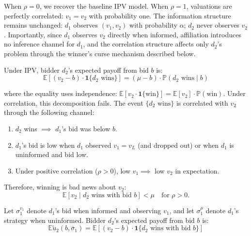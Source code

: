 \documentclass[11pt]{article}
\theoremstyle{plain}
\theoremstyle{definition}
\theoremstyle{plain}
\theoremstyle{plain}
\theoremstyle{plain}
\theoremstyle{plain}
\numberwithin{equation}{section}
\begin{document}
\noindent When $\rho = 0$, we recover the baseline IPV model. When $\rho = 1$, valuations are perfectly correlated: $v_1 = v_2$ with probability one. The information structure remains unchanged: $d_1$ observes $(v_1, v_2)$ with probability $\alpha$; $d_2$ never observes $v_2$. Importantly, since $d_1$ observes $v_2$ directly when informed, affiliation introduces no inference channel for $d_1$, and the correlation structure affects only $d_2$'s problem through the winner's curse mechanism described below.

\vspace{0.3cm}

\noindent Under IPV, bidder $d_2$'s expected payoff from bid $b$ is:
\begin{equation*}
    \mathbb{E}[(v_2 - b) \cdot \mathbf{1}\{d_2 \text{ wins}\}] = (\mu - b) \cdot \mathbb{P}(d_2 \text{ wins} \mid b)
\end{equation*}

\noindent where the equality uses independence: $\mathbb{E}[v_2 \cdot \mathbf{1}\{\text{win}\}] = \mathbb{E}[v_2] \cdot \mathbb{P}(\text{win})$. Under correlation, this decomposition fails. The event $\{d_2 \text{ wins}\}$ is correlated with $v_2$ through the following channel:
\begin{enumerate}
    \item $d_2$ wins $\implies$ $d_1$'s bid was below $b$.
    \item $d_1$'s bid is low when $d_1$ observed $v_1 = v_L$ (and dropped out) or when $d_1$ is uninformed and bid low.
    \item Under positive correlation ($\rho > 0$), low $v_1 \implies$ low $v_2$ in expectation.
\end{enumerate}

\noindent Therefore, winning is bad news about $v_2$:
\begin{equation*}
    \mathbb{E}[v_2 \mid d_2 \text{ wins with bid } b] < \mu \quad \text{for } \rho > 0.
\end{equation*}

\vspace{0.3cm}

\noindent Let $\sigma_1^{v_1}$ denote $d_1$'s bid when informed and observing $v_1$, and let $\sigma_1^\mu$ denote $d_1$'s strategy when uninformed. Bidder $d_2$'s expected payoff from bid $b$ is:
\begin{equation*}
    \mathbb{E}\tilde{u}_2(b,\overline{\sigma}_1) = \mathbb{E}\left[ (v_2 - b) \cdot \mathbf{1}\{d_2 \text{ wins with bid } b\} \right]
\end{equation*}
\end{document}
